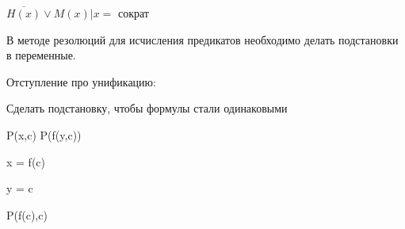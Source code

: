 \documentclass[russian]{lecture-notes}
\begin{document}
    $\overline{H(x)} \lor M(x)| x = $ сократ

    В методе резолюций для исчисления предикатов необходимо делать подстановки в переменные.

    Отступление про унификацию:

    \begin{definition}

        Сделать подстановку, чтобы формулы стали одинаковыми

        \end{definition}

    P(x,c) \qquad \qquad \qquad P(f(y,c))

    \searrow \qquad  x = f(c) \qquad \swarrow

     \qquad \searrow  y = c \qquad \swarrow

    \qquad \qquad P(f(c),c)
\end{document}
